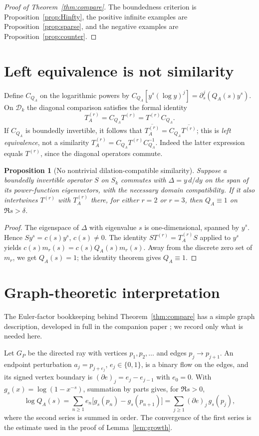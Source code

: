 \documentclass[12pt,letterpaper]{article}
\newtheorem{proposition}[theorem]{Proposition}
\theoremstyle{remark}
\numberwithin{equation}{section}
\begin{document}
\begin{proof}[Proof of Theorem~\ref{thm:compare}]
The boundedness criterion is Proposition~\ref{prop:Hinfty}, the positive infinite examples are Proposition~\ref{prop:sparse}, and the negative examples are Proposition~\ref{prop:counter}.
\end{proof}

\section{Left equivalence is not similarity}
Define $C_{Q_A}$ on the logarithmic powers by $C_{Q_A}[y^s(\log y)^j]=\partial_s^j(Q_A(s)y^s)$. On $\mathcal D_k$ the diagonal comparison satisfies the formal identity
\[
 T_A^{(r)}=C_{Q_A}T^{(r)}=T^{(r)}C_{Q_A}.
\]
If $C_{Q_A}$ is boundedly invertible, it follows that
$\overline{T_A^{(r)}}=C_{Q_A}\overline{T^{(r)}}$; this is \emph{left equivalence}, not a similarity $T_A^{(r)}=C_{Q_A}T^{(r)}C_{Q_A}^{-1}$. Indeed the latter expression equals $T^{(r)}$, since the diagonal operators commute.

\begin{proposition}[No nontrivial dilation-compatible similarity]\label{prop:nosim}
Suppose a boundedly invertible operator $S$ on $S_k$ commutes with $\Delta=y\,d/dy$ on the span of its power-function eigenvectors, with the necessary domain compatibility. If it also intertwines $T^{(r)}$ with $T_A^{(r)}$ there, for either $r=2$ or $r=3$, then $Q_A\equiv1$ on $\Re s>\delta$.
\end{proposition}
\begin{proof}
The eigenspace of $\Delta$ with eigenvalue $s$ is one-dimensional, spanned by $y^s$. Hence $Sy^s=c(s)y^s$, $c(s)\ne0$. The identity $ST^{(r)}=T_A^{(r)}S$ applied to $y^s$ yields $c(s)m_r(s)=c(s)Q_A(s)m_r(s)$. Away from the discrete zero set of $m_r$, we get $Q_A(s)=1$; the identity theorem gives $Q_A\equiv1$.
\end{proof}


\section{Graph-theoretic interpretation}
\label{sec:prime-graphs}

The Euler-factor bookkeeping behind Theorem~\ref{thm:compare} has a
simple graph description, developed in full in the companion paper
\cite[Section~6]{PP26}; we record only what is needed here.

Let $G_P$ be the directed ray with vertices $p_1,p_2,\ldots$ and
edges $p_j\to p_{j+1}$.  An endpoint perturbation $a_j=p_{j+e_j}$,
$e_j\in\{0,1\}$, is a binary flow on the edges, and its signed vertex
boundary is $(\partial e)_j=e_j-e_{j-1}$ with $e_0=0$.  With
$g_s(x)=\log(1-x^{-s})$, summation by parts gives, for $\Re s>0$,
\begin{equation}\label{eq:graph-product}
 \log Q_A(s)=\sum_{n\ge1}e_n\bigl[g_s(p_n)-g_s(p_{n+1})\bigr]
 =\sum_{j\ge1}(\partial e)_j\,g_s(p_j),
\end{equation}
where the second series is summed in order.  The convergence of the
first series is the estimate used in the proof of Lemma~\ref{lem:growth}.
\end{document}
